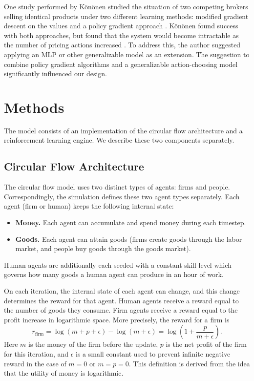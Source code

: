 \documentclass[twoside,twocolumn]{article}
\begin{document}
\medskip

One study performed by K\"on\"onen studied the situation of two competing brokers selling identical products under two different learning methods: modified gradient descent on the values and a policy gradient approach \cite{doi:10.1002/int.20121}. K\"on\"onen found success with both approaches, but found that the system would become intractable as the number of pricing actions increased \cite{doi:10.1002/int.20121}. To address this, the author suggested applying an MLP or other generalizable model as an extension. The suggestion to combine policy gradient algorithms and a generalizable action-choosing model significantly influenced our design. 

\section{Methods}

The model consists of an implementation of the circular flow architecture and a reinforcement learning engine. We describe these two components separately.

\subsection{Circular Flow Architecture}

The circular flow model uses two distinct types of agents: firms and people. Correspondingly, the simulation defines these two agent types separately. Each agent (firm or human) keeps the following internal state:
\begin{itemize}
  \item \textbf{Money.} Each agent can accumulate and spend money during each timestep.
  \item \textbf{Goods.} Each agent can attain goods (firms create goods through the labor market, and people buy goods through the goods market).
\end{itemize}
Human agents are additionally each seeded with a constant skill level which governs how many goods a human agent can produce in an hour of work. 

\medskip

On each iteration, the internal state of each agent can change, and this change determines the reward for that agent. Human agents receive a reward equal to the number of goods they consume. Firm agents receive a reward equal to the profit increase in logarithmic space. More precisely, the reward for a firm is 
\[
  r_\text{firm} = \log (m + p + \epsilon) - \log(m + \epsilon) = \log\left(1 + \frac{p}{m + \epsilon}\right).  
\]
Here $m$ is the money of the firm before the update, $p$ is the net profit of the firm for this iteration, and $\epsilon$ is a small constant used to prevent infinite negative reward in the case of $m = 0$ or $m = p = 0$. This definition is derived from the idea that the utility of money is logarithmic.
\end{document}
